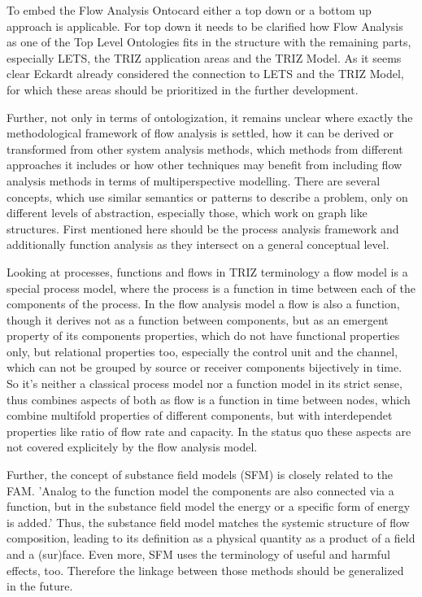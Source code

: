 \documentclass[a4paper,11pt]{article}
\begin{document}
        To embed the Flow Analysis Ontocard either a top down or a bottom up 
        approach is applicable. For top down it needs to be clarified how Flow 
        Analysis as one of the Top Level Ontologies fits in the structure with 
        the remaining parts, especially LETS, the TRIZ application areas and
        the TRIZ Model. As it seems clear Eckardt already considered the 
        connection to LETS and the TRIZ Model, for which these areas should be 
        prioritized in the further development.
        
        Further, not only in terms of ontologization, it remains unclear where 
        exactly the methodological framework of flow analysis is settled, how 
        it can be derived or transformed from other system analysis methods, 
        which methods from different approaches it includes or how other 
        techniques may benefit from including flow analysis methods in terms of
        multiperspective modelling. There are several concepts, which use 
        similar semantics or patterns to describe a problem, only on different 
        levels of abstraction, especially those, which work on graph like 
        structures. First mentioned here should be the process analysis 
        framework and additionally function analysis as they intersect on a 
        general conceptual level.

        Looking at processes, functions and flows in TRIZ terminology 
        \cite{Souchkov2018} \cite{Eckardt2020} a flow model is a special 
        process model, where the process is a function in time between each of
        the components of the process. \cite{KoltzeSouchkov2017} In the flow 
        analysis model a flow is also a function, though it derives not as a 
        function between components, but as an emergent property of its 
        components properties, which do not have functional properties only, 
        but relational properties too, especially the control unit and the 
        channel, which can not be grouped by source or receiver components 
        bijectively in time. So it's neither a classical process model nor a 
        function model in its strict sense, thus combines aspects of both as 
        flow is a function in time between nodes, which combine multifold 
        properties of different components, but with interdependet properties 
        like ratio of flow rate and capacity. In the status quo these aspects 
        are not covered explicitely by the flow analysis model.

        Further, the concept of substance field models (SFM) is closely related
        to the FAM. 'Analog to the function model the components are also 
        connected via a function, but in the substance field model the energy 
        or a specific form of energy is added.' \cite{KoltzeSouchkov2017} Thus,
        the substance field model matches the systemic structure of flow 
        composition, leading to its definition as a physical quantity as a 
        product of a field and a (sur)face. \cite{Flussdefinition(Physik)}
        Even more, SFM uses the terminology of useful and harmful effects, too.
        \cite{KoltzeSouchkov2017} Therefore the linkage between those methods 
        should be generalized in the future.
\end{document}
